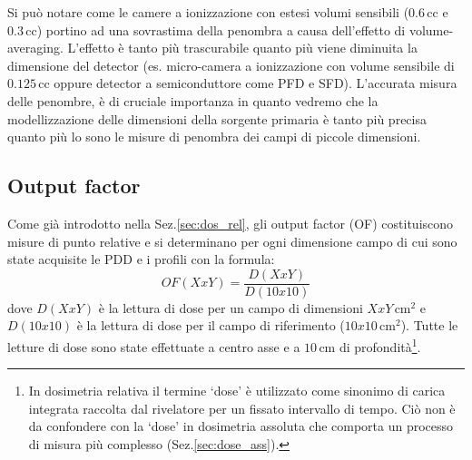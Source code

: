 Si può notare come le camere a ionizzazione con estesi volumi sensibili ($0.6\,$cc e $0.3\,$cc) portino ad una sovrastima della penombra a causa dell'effetto di volume-averaging. L'effetto è tanto più trascurabile quanto più viene diminuita la dimensione del detector (es. micro-camera a ionizzazione con volume sensibile di $0.125\,$cc oppure detector a semiconduttore come PFD e SFD). L'accurata misura delle penombre, è di cruciale importanza in quanto vedremo che la modellizzazione delle dimensioni della sorgente primaria è tanto più precisa quanto più lo sono le misure di penombra dei campi di piccole dimensioni.

\subsection{Output factor}
Come già introdotto nella Sez.\ref{sec:dos_rel}, gli output factor (OF) costituiscono misure di punto relative e si determinano per ogni dimensione campo di cui sono state acquisite le PDD e i profili con la formula:
\begin{equation}
\label{eq:OF}
OF(XxY)=\frac{D(XxY)}{D(10x10)}
\end{equation}
dove $D(XxY)$ è la lettura di dose per un campo di dimensioni $XxY\,$cm$^2$ e $D(10x10)$ è la lettura di dose per il campo di riferimento ($10x10\,$cm$^2$). Tutte le letture di dose sono state effettuate a centro asse e a $10\,$cm di profondità\footnote{In dosimetria relativa il termine `dose' è utilizzato come sinonimo di carica integrata raccolta dal rivelatore per un fissato intervallo di tempo.  Ciò non è da confondere con la `dose' in dosimetria assoluta che comporta un processo di misura più complesso (Sez.\ref{sec:dose_ass}).}.

